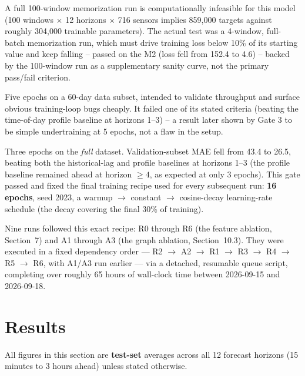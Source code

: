 \documentclass[11pt]{article}
\newcommand{\gate}[1]{\textcolor{navy}{\headingfont\bfseries #1}}
\begin{document}
\begin{description}[leftmargin=0pt, style=nextline]
\item[\gate{Gate 1 -- Overfit Test.}] A full 100-window memorization run is computationally
  infeasible for this model (100 windows $\times$ 12 horizons $\times$ 716 sensors implies 859{,}000
  targets against roughly 304{,}000 trainable parameters). The actual test was a 4-window,
  full-batch memorization run, which must drive training loss below 10\% of its starting value
  and keep falling -- passed on the M2 (loss fell from 152.4 to 4.6) -- backed by the 100-window
  run as a supplementary sanity curve, not the primary pass/fail criterion.
\item[\gate{Gate 2 -- Subset Timing.}] Five epochs on a 60-day data subset, intended to validate
  throughput and surface obvious training-loop bugs cheaply. It failed one of its stated criteria
  (beating the time-of-day profile baseline at horizons 1--3) -- a result later shown by Gate 3
  to be simple undertraining at 5 epochs, not a flaw in the setup.
\item[\gate{Gate 3 -- First 25\% of R0.}] Three epochs on the \emph{full} dataset. Validation-subset
  MAE fell from 43.4 to 26.5, beating both the historical-lag and profile baselines at horizons
  1--3 (the profile baseline remained ahead at horizon $\ge 4$, as expected at only 3 epochs).
  This gate passed and fixed the final training recipe used for every subsequent run: \textbf{16
  epochs}, seed 2023, a warmup $\to$ constant $\to$ cosine-decay learning-rate schedule (the
  decay covering the final 30\% of training).
\end{description}

Nine runs followed this exact recipe: R0 through R6 (the feature ablation, Section~7) and A1
through A3 (the graph ablation, Section~10.3). They were executed in a fixed dependency order
--- R2 $\to$ A2 $\to$ R1 $\to$ R3 $\to$ R4 $\to$ R5 $\to$ R6, with A1/A3 run earlier --- via a
detached, resumable queue script, completing over roughly 65 hours of wall-clock time between
2026-09-15 and 2026-09-18.

\section{Results}

All figures in this section are \textbf{test-set} averages across all 12 forecast horizons (15
minutes to 3 hours ahead) unless stated otherwise.
\end{document}
